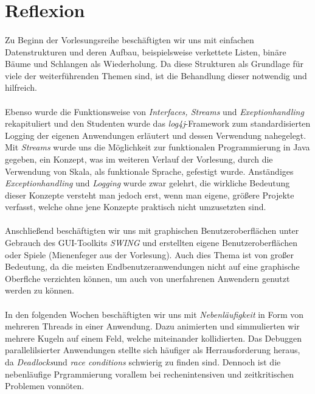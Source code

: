 \documentclass[10pt, a4paper]{article}
\begin{document}
\pagebreak



\section*{Reflexion}

\paragraph*{}
Zu Beginn der Vorlesungsreihe beschäftigten wir uns mit einfachen Datenstrukturen und deren Aufbau, beispielsweise verkettete Listen, binäre Bäume und Schlangen als Wiederholung. Da diese Strukturen als Grundlage für viele der weiterführenden Themen sind, ist die Behandlung dieser notwendig und hilfreich.\par

\paragraph*{}
Ebenso wurde die Funktionsweise von \textit{Interfaces, Streams} und \textit{Exeptionhandling} rekapituliert und den Studenten wurde das \textit{log4j}-Framework zum standardisierten Logging der eigenen Anwendungen erläutert und dessen Verwendung nahegelegt. Mit \textit{Streams} wurde uns die Möglichkeit zur funktionalen Programmierung in Java gegeben, ein Konzept, was im weiteren Verlauf der Vorlesung, durch die Verwendung von Skala, als funktionale Sprache, gefestigt wurde. Anständiges \textit{Exceptionhandling} und \textit{Logging} wurde zwar gelehrt, die wirkliche Bedeutung dieser Konzepte versteht man jedoch erst, wenn man eigene, größere Projekte verfasst, welche ohne jene Konzepte praktisch nicht umzusetzten sind.\par


\paragraph*{}
Anschließend beschäftigten wir uns mit graphischen Benutzeroberflächen unter Gebrauch des GUI-Toolkits \textit{SWING} und erstellten eigene Benutzeroberflächen oder Spiele (Mienenfeger aus der Vorlesung). Auch dies Thema ist von großer Bedeutung, da die meisten Endbenutzeranwendungen nicht auf eine graphische Oberflche verzichten können, um auch von unerfahrenen Anwendern genutzt werden zu können.
\par

\paragraph*{}
In den folgenden Wochen beschäftigten wir uns mit \textit{Nebenläufigkeit} in Form von mehreren Threads in einer Anwendung. Dazu animierten und simmulierten wir mehrere Kugeln auf einem Feld, welche miteinander kollidierten. Das Debuggen parallelilsierter Anwendungen stellte sich häufiger als Herrausforderung heraus, da \textit{Deadlocks}und \textit{race conditions} schwierig zu finden sind. Dennoch ist die nebenläufige Prgrammierung vorallem bei rechenintensiven und zeitkritischen Problemen vonnöten.\par
\end{document}
